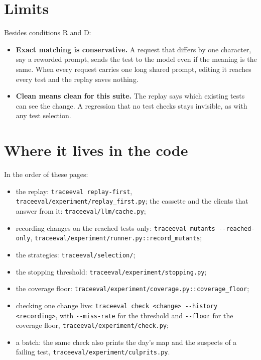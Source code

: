 \documentclass[11pt,a4paper]{article}
\begin{document}
\section{Limits}

Besides conditions R and D:
\begin{itemize}
  \item \textbf{Exact matching is conservative.} A request that differs by one character, say a reworded prompt,
        sends the test to the model even if the meaning is the same. When every request carries one long shared
        prompt, editing it reaches every test and the replay saves nothing.
  \item \textbf{Clean means clean for this suite.} The replay says which existing tests can see the change. A
        regression that no test checks stays invisible, as with any test selection.
\end{itemize}

\section{Where it lives in the code}

In the order of these pages:
\begin{itemize}
  \item the replay: \texttt{traceeval replay-first}, \texttt{traceeval/experiment/replay\_first.py}; the cassette
        and the clients that answer from it: \texttt{traceeval/llm/cache.py};
  \item recording changes on the reached tests only: \texttt{traceeval mutants -{}-reached-only},
        \texttt{traceeval/experiment/runner.py::record\_mutants};
  \item the strategies: \texttt{traceeval/selection/};
  \item the stopping threshold: \texttt{traceeval/experiment/stopping.py};
  \item the coverage floor: \texttt{traceeval/experiment/coverage.py::coverage\_floor};
  \item checking one change live: \texttt{traceeval check <change> -{}-history <recording>}, with
        \texttt{-{}-miss-rate} for the threshold and \texttt{-{}-floor} for the coverage floor,
        \texttt{traceeval/experiment/check.py};
  \item a batch: the same check also prints the day's map and the suspects of a failing test,
        \texttt{traceeval/experiment/culprits.py}.
\end{itemize}
\end{document}
